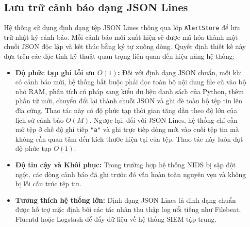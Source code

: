 \subsection{Lưu trữ cảnh báo dạng JSON Lines}
Hệ thống sử dụng định dạng tệp JSON Lines thông qua lớp \texttt{AlertStore} để lưu trữ nhật ký cảnh báo. Mỗi cảnh báo mới xuất hiện sẽ được mã hóa thành một chuỗi JSON độc lập và kết thúc bằng ký tự xuống dòng.
Quyết định thiết kế này dựa trên các đặc tính kỹ thuật quan trọng liên quan đến hiệu năng hệ thống:
\begin{itemize}
    \item \textbf{Độ phức tạp ghi tối ưu $O(1)$:} Đối với định dạng JSON chuẩn, mỗi khi có cảnh báo mới, hệ thống bắt buộc phải đọc toàn bộ nội dung file cũ vào bộ nhớ RAM, phân tích cú pháp sang kiểu dữ liệu danh sách của Python, thêm phần tử mới, chuyển đổi lại thành chuỗi JSON và ghi đè toàn bộ tệp tin lên đĩa cứng. Thao tác này có độ phức tạp thời gian tăng dần theo độ lớn của lịch sử cảnh báo $O(M)$. Ngược lại, đối với JSON Lines, hệ thống chỉ cần mở tệp ở chế độ ghi tiếp \texttt{"a"} và ghi trực tiếp dòng mới vào cuối tệp tin mà không cần quan tâm đến kích thước hiện tại của tệp. Thao tác này luôn đạt độ phức tạp $O(1)$.
    \item \textbf{Độ tin cậy và Khôi phục:} Trong trường hợp hệ thống NIDS bị sập đột ngột, các dòng cảnh báo đã ghi trước đó vẫn hoàn toàn nguyên vẹn và không bị lỗi cấu trúc tệp tin.
    \item \textbf{Tương thích hệ thống lớn:} Định dạng JSON Lines là định dạng chuẩn được hỗ trợ mặc định bởi các tác nhân thu thập log nổi tiếng như Filebeat, Fluentd hoặc Logstash để đẩy dữ liệu về hệ thống SIEM tập trung.
\end{itemize}


